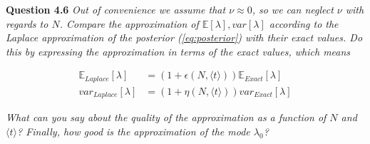 \documentclass[a4paper]{article}
\begin{document}
\textbf{Question 4.6}  \textit{Out of convenience we assume that $\nu \approx 0$, so we can neglect $\nu$ with regards to $N$. Compare the approximation of $\mathbb{E}[\lambda], var[\lambda]$ according to the Laplace approximation of the posterior (\ref{eq:posterior}) with their exact values. Do this by expressing the approximation in terms of the exact values, which means}

\begin{align*}
\mathbb{E}_{Laplace}[\lambda] &= (1 + \epsilon (N, \langle t \rangle) )  \mathbb{E}_{Exact}[\lambda]\\
var_{Laplace}[\lambda] &= (1 + \eta (N, \langle t \rangle) )  var_{Exact}[\lambda]
\end{align*} 

\textit{What can you say about the quality of the approximation as a function of $N$ and $\langle t \rangle$? Finally, how good is the approximation of the mode $\lambda_0$?}
\end{document}
